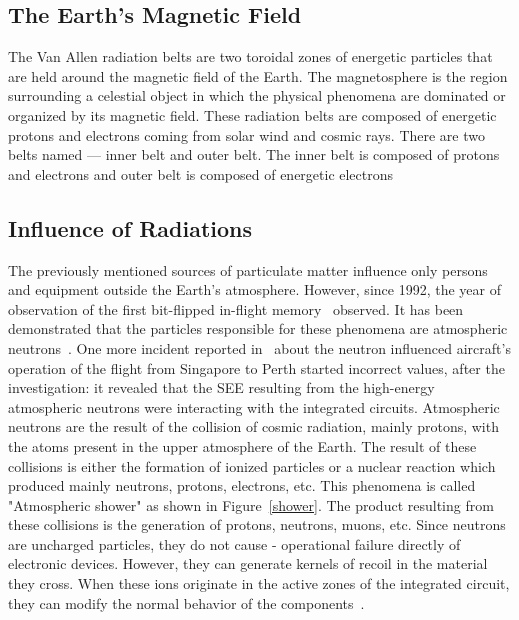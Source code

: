 \subsection{The Earth's Magnetic Field}

The Van Allen radiation belts are two toroidal zones of energetic particles that are held around the magnetic field of the Earth. The magnetosphere is the region surrounding a celestial object in which the
physical phenomena are dominated or organized by its magnetic field. These radiation belts are composed of energetic protons and electrons coming from solar wind and cosmic rays. There are two belts named --- inner belt and outer belt. The inner belt is composed of protons and electrons and outer belt is composed of energetic electrons~\citep{barth2003space}


\subsection{Influence of Radiations}
The previously mentioned sources of particulate matter influence only persons and equipment
outside the Earth's atmosphere. However, since 1992, the year of observation of the first
bit-flipped in-flight memory~\citep{taber1995investigation, taber1993single} observed. It has been demonstrated that the particles responsible for these
phenomena are atmospheric neutrons~\citep{leray2004atmospheric, jedec2006measurement}.
One more incident reported in~\cite{SWE20216} about the neutron influenced aircraft's operation of the flight from Singapore to Perth started incorrect values, after the investigation: it revealed that the SEE resulting from the high-energy atmospheric neutrons were interacting with the integrated circuits.
Atmospheric neutrons are the result of the collision of cosmic radiation,
mainly protons, with the atoms present in the upper atmosphere of the Earth. The result of these collisions is either the formation of ionized particles or a nuclear reaction which
produced mainly neutrons, protons, electrons, etc. This phenomena is called
"Atmospheric shower" as shown in Figure~\ref{shower}. The product resulting from these collisions is the generation of
protons, neutrons, muons, etc. Since neutrons are uncharged particles, they do not
cause  - operational failure directly of electronic devices. However, they can generate kernels of recoil in
the material they cross. When these ions originate in the active zones of the integrated circuit, they can modify the normal behavior of the components~\cite{normand1998extensions}.
%


